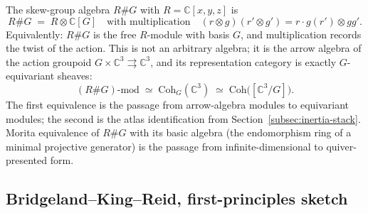 The skew-group algebra $R \# G$ with $R = \mathbb{C}[x,y,z]$ is
\[
R \# G \;=\; R \otimes \mathbb{C}[G] \quad\text{with multiplication}\quad (r \otimes g)(r' \otimes g') = r \cdot g(r') \otimes gg'.
\]
Equivalently: $R \# G$ is the free $R$-module with basis $G$, and multiplication records the twist of the action. This is not an arbitrary algebra; it is the arrow algebra of the action groupoid $G \times \mathbb{C}^3 \rightrightarrows \mathbb{C}^3$, and its representation category is exactly $G$-equivariant sheaves:
\[
(R \# G)\text{-mod} \;\simeq\; \mathrm{Coh}_G(\mathbb{C}^3) \;\simeq\; \mathrm{Coh}\bigl([\mathbb{C}^3/G]\bigr).
\]
The first equivalence is the passage from arrow-algebra modules to equivariant modules; the second is the atlas identification from Section~\ref{subsec:inertia-stack}. Morita equivalence of $R \# G$ with its basic algebra (the endomorphism ring of a minimal projective generator) is the passage from infinite-dimensional to quiver-presented form.

\subsection{Bridgeland--King--Reid, first-principles sketch}
\label{subsec:bkr-first-principles}

